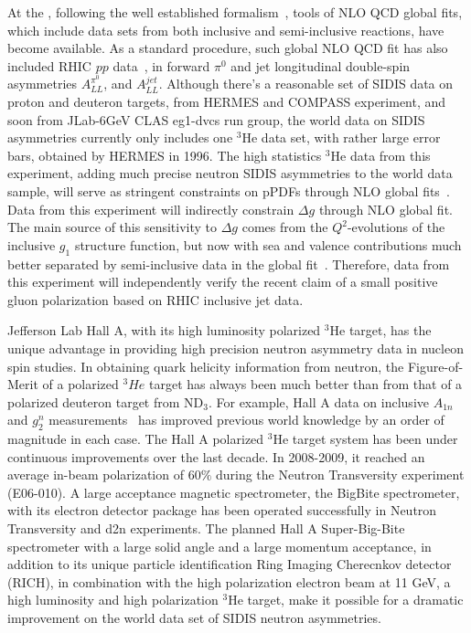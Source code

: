 At the \nloo, following the well established formalism~\cite{PhysRevLett.101.072001},
tools of NLO QCD global fits, which include data sets from both inclusive and semi-inclusive reactions,
have become available.   As a standard procedure,  such global NLO QCD fit
has also included RHIC $pp$ data~\cite{deFlorian:2014yva}, in forward $\pi^0$ and jet longitudinal double-spin asymmetries $A_{LL}^{\pi^0}$, and $A_{LL}^{jet}$. 
Although there's a reasonable  set of SIDIS  data on proton and deuteron targets, from HERMES and COMPASS experiment, and soon from JLab-6GeV CLAS eg1-dvcs run group,  the world data on SIDIS asymmetries  currently only includes
one $^3$He data set, with rather large error bars, obtained by HERMES in 1996.
The high statistics $^3$He data from this experiment, adding much precise
 neutron SIDIS asymmetries to the world data sample,  
will serve as stringent constraints on pPDFs through NLO global fits~\cite{epjcxj2006}. 
Data from this experiment  will  indirectly constrain  $\Delta g$   through NLO global fit. 
The main source of this sensitivity to $\Delta g$ comes from 
the $Q^2$-evolutions of the inclusive $g_1$ structure function, but now with 
 sea and valence contributions much better
 separated by semi-inclusive data in the global fit~\cite{sassotnlo,epjcxj2006}.
Therefore,  data from this experiment will  independently verify 
the recent claim of a small positive gluon polarization based on RHIC inclusive jet data. 

Jefferson Lab Hall A, with its high luminosity polarized $^3$He target, has the unique
advantage in providing high precision neutron asymmetry data in nucleon spin studies. 
In obtaining quark helicity information from neutron,  the Figure-of-Merit of  a polarized $^3He$ target has always been much better than from that of a polarized deuteron target from ND$_3$.
For example, Hall A data on inclusive  $A_{1n}$ and $g_2^n$ measurements~\cite{xiaochao,kevin}
has improved previous world knowledge by an order of magnitude in each case. 
The Hall A polarized $^3$He target system has been under continuous improvements over 
the last decade.  In 2008-2009, it reached an average in-beam polarization of 60$\%$  
during the Neutron Transversity experiment (E06-010).
A large acceptance magnetic spectrometer, the BigBite spectrometer, with its electron detector package
has been operated successfully in Neutron Transversity and d2n experiments. 
The planned Hall A Super-Big-Bite spectrometer with  a large solid angle and a large momentum acceptance, in addition to its unique particle identification Ring Imaging Cherecnkov  detector (RICH), 
in  combination with the high polarization electron beam at 11 GeV, 
a high luminosity and high polarization $^3$He target,  make it possible for a dramatic improvement on the world data set of 
SIDIS neutron asymmetries.


